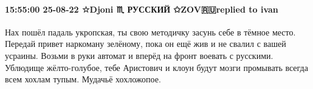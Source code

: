  
 
 
 
 

\paragraph{15:55:00 25-08-22 ☆Djoni ♏ РУССКИЙ ✩ZOV🇷🇺replied to ivan}

Нах пошёл падаль укропская, ты свою методичку засунь себе в тёмное место.
Передай привет наркоману зелёному, пока он ещё жив и не свалил с вашей усраины.
Возьми в руки автомат и вперёд на фронт воевать с русскими. Ублюдище
жёлто-голубое, тебе Аристович и клоун будут мозги промывать всегда всем хохлам
тупым. Мудачьё хохложопое.


